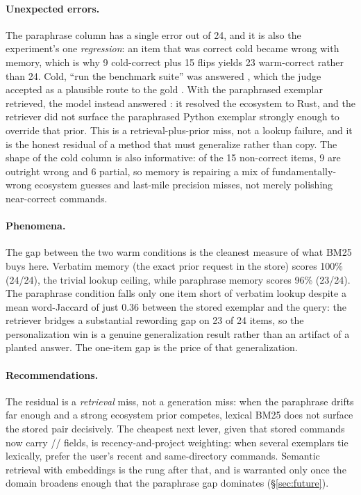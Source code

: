 \paragraph{Unexpected errors.}
The paraphrase column has a single error out of 24, and it is also the experiment's one
\emph{regression}: an item that was correct cold became wrong with memory, which is why
9 cold-correct plus 15 flips yields 23 warm-correct rather than 24. Cold, 
``run the benchmark suite'' was answered , which the judge accepted
as a plausible route to the gold . With the paraphrased
exemplar retrieved, the model instead answered : it resolved the
ecosystem to Rust, and the retriever did not surface the paraphrased Python exemplar
strongly enough to override that prior. This is a retrieval-plus-prior miss, not a
lookup failure, and it is the honest residual of a method that must generalize rather
than copy. The shape of the cold column is also informative: of the 15 non-correct
items, 9 are outright wrong and 6 partial, so memory is repairing a mix of
fundamentally-wrong ecosystem guesses and last-mile precision misses, not merely
polishing near-correct commands.

\paragraph{Phenomena.}
The gap between the two warm conditions is the cleanest measure of what BM25 buys here.
Verbatim memory (the exact prior request in the store) scores 100\% (24/24), the trivial
lookup ceiling, while paraphrase memory scores 96\% (23/24). The paraphrase condition
falls only one item short of verbatim lookup despite a mean word-Jaccard of just 0.36
between the stored exemplar and the query: the retriever bridges a substantial rewording
gap on 23 of 24 items, so the personalization win is a genuine generalization result
rather than an artifact of a planted answer. The one-item gap is the price of that
generalization.

\paragraph{Recommendations.}
The residual is a \emph{retrieval} miss, not a generation miss: when the paraphrase
drifts far enough and a strong ecosystem prior competes, lexical BM25 does not surface
the stored pair decisively. The cheapest next lever, given that stored commands now carry
// fields, is recency-and-project weighting: when
several exemplars tie lexically, prefer the user's recent and same-directory commands.
Semantic retrieval with embeddings is the rung after that, and is warranted only once the
domain broadens enough that the paraphrase gap dominates
(\S\ref{sec:future}).


